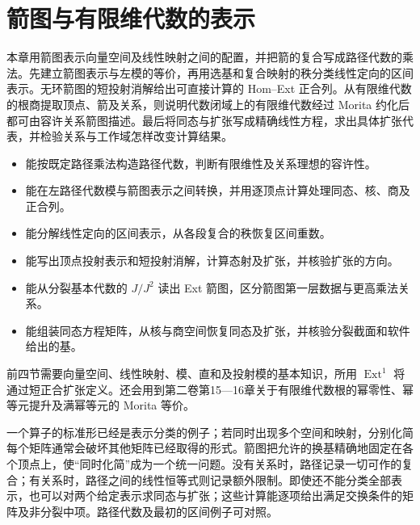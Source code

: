 \chapter{箭图与有限维代数的表示}
\label{b5:ch:09}

\begin{chapterabstract}
	本章用箭图表示向量空间及线性映射之间的配置，并把箭的复合写成路径代数的乘法。先建立箭图表示与左模的等价，再用选基和复合映射的秩分类线性定向的区间表示。无环箭图的短投射消解给出可直接计算的 Hom--Ext 正合列。从有限维代数的根商提取顶点、箭及关系，则说明代数闭域上的有限维代数经过 Morita 约化后都可由容许关系箭图描述。最后将同态与扩张写成精确线性方程，求出具体扩张代表，并检验关系与工作域怎样改变计算结果。
\end{chapterabstract}

\begin{learninggoals}
	\begin{itemize}
		\item 能按既定路径乘法构造路径代数，判断有限维性及关系理想的容许性。
		\item 能在左路径代数模与箭图表示之间转换，并用逐顶点计算处理同态、核、商及正合列。
		\item 能分解线性定向的区间表示，从各段复合的秩恢复区间重数。
		\item 能写出顶点投射表示和短投射消解，计算态射及扩张，并核验扩张的方向。
		\item 能从分裂基本代数的 \(J/J^2\) 读出 Ext 箭图，区分箭图第一层数据与更高乘法关系。
		\item 能组装同态方程矩阵，从核与商空间恢复同态及扩张，并核验分裂截面和软件给出的基。
	\end{itemize}
	前四节需要向量空间、线性映射、模、直和及投射模的基本知识，所用 \(\operatorname{Ext}^1\) 将通过短正合扩张定义。还会用到第二卷第15—16章关于有限维代数根的幂零性、幂等元提升及满幂等元的 Morita 等价。
\end{learninggoals}

一个算子的标准形已经是表示分类的例子；若同时出现多个空间和映射，分别化简每个矩阵通常会破坏其他矩阵已经取得的形式。箭图把允许的换基精确地固定在各个顶点上，使“同时化简”成为一个统一问题。没有关系时，路径记录一切可作的复合；有关系时，路径之间的线性恒等式则记录额外限制。即使还不能分类全部表示，也可以对两个给定表示求同态与扩张；这些计算能逐项给出满足交换条件的矩阵及非分裂中项。路径代数及最初的区间例子可对照\cite[Section 2.8, pp. 19--22; Section 6.2, pp. 150--153]{EtingofEtAl2011RepresentationTheory}。

